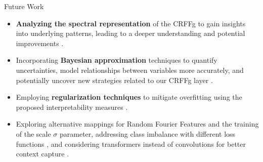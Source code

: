 \documentclass[aspectratio=169]{beamer}
\let\oldcite\cite %
\renewcommand{\cite}[1]{{\tiny\oldcite{#1}}}
\begin{document}
\begin{frame}{Future Work}

\begin{itemize}
    \setlength\itemsep{1em}
    \item \textbf{Analyzing the spectral representation} of the CRFFg to gain insights into underlying patterns, leading to a deeper understanding and potential improvements \cite{ZHANG202041}.
    
    \item Incorporating \textbf{Bayesian approximation} techniques to quantify uncertainties, model relationships between variables more accurately, and potentially uncover new strategies related to our CRFFg layer \cite{MILLER2022100598}.
    
    \item Employing \textbf{regularization techniques} to mitigate overfitting using the proposed interpretability measures \cite{chang2020mixupcam, 9506582}.

    \item Exploring alternative mappings for Random Fourier Features \cite{sutherland2015error} and the training of the scale $\sigma$ parameter, addressing class imbalance with different loss functions \cite{YEUNG2022102026}, and considering transformers instead of convolutions for better context capture \cite{azad2023advances}.
\end{itemize}
\end{frame}
\end{document}
